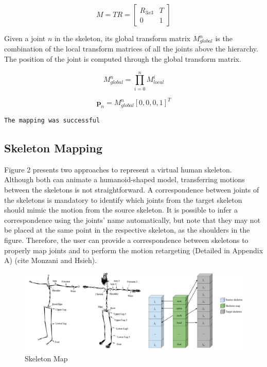 \documentclass{vgtc}
\makeatletter
\def\maxwidth{\ifdim\Gin@nat@width>\linewidth\linewidth
    \else\Gin@nat@width\fi}
\let\Oldincludegraphics\includegraphics
\renewcommand{\includegraphics}[1]{\Oldincludegraphics[width=.8\maxwidth]{#1}}
\makeatother
\begin{document}
\begin{equation}
\label{eq:transformmatrix}
M = TR = \begin{bmatrix}
    R_{3x3} & T \\
    0 & 1
    \end{bmatrix}
\end{equation}

Given a joint \(n\) in the skeleton, its global transform matrix
\(M_{global}^{n}\) is the combination of the local transform matrices of
all the joints above the hierarchy. The position of the joint is
computed through the global transform matrix.

\begin{equation}
\label{eq:transformmatrixglobal}
M_{global}^{n} = \prod_{i=0}^{n} M_{local}^{i}
\end{equation}

\begin{equation}
\label{eq:position}
\mathbf{p}_{n} = M_{global}^{n}[0,0,0,1]^T
\end{equation}


    \begin{Verbatim}[commandchars=\\\{\}]
The mapping was successful
\end{Verbatim}



    \subsection{Skeleton Mapping}\label{skeleton-mapping}

Figure 2 presents two approaches to represent a virtual human skeleton.
Although both can animate a humanoid-shaped model, transferring motions
between the skeletons is not straightforward. A correspondence between
joints of the skeletons is mandatory to identify which joints from the
target skeleton should mimic the motion from the source skeleton. It is
possible to infer a correspondence using the joints' name automatically,
but note that they may not be placed at the same point in the respective
skeleton, as the shoulders in the figure. Therefore, the user can
provide a correspondence between skeletons to properly map joints and to
perform the motion retargeting (Detailed in Appendix A) (cite Monzani
and Hsieh).

\begin{figure}
\centering
\includegraphics{../figures/skelmap.png}
\caption{Skeleton Map}
\end{figure}
\end{document}
